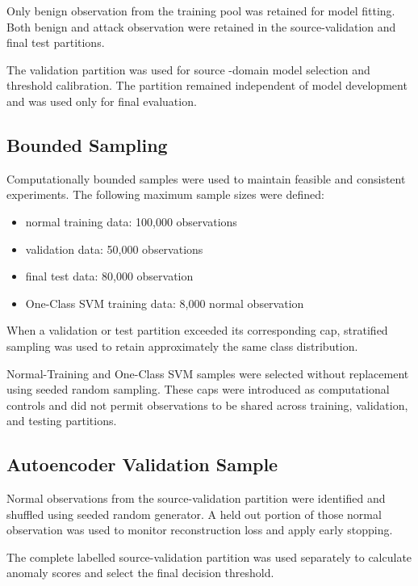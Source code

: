  Only benign observation from the training pool was retained for model fitting. Both benign and attack observation were retained in the source-validation and final test partitions.
 
 The validation partition was used for source -domain model selection and threshold calibration. The partition remained independent of model development and was used only for final evaluation.
 
 \subsection{Bounded Sampling}
 
 Computationally bounded samples were used to maintain feasible and consistent experiments. The following maximum sample sizes were defined:
 
 \begin{itemize}
        \item normal training data: 100,000 observations
        \item validation data: 50,000 observations
        \item final test data: 80,000 observation
        \item One-Class SVM training data: 8,000 normal observation
 \end{itemize}
 
 When a validation or test partition exceeded its corresponding cap, stratified sampling was used to retain approximately the same class distribution.
 
 Normal-Training and One-Class SVM samples were selected without replacement using seeded random sampling. These caps were introduced as  computational controls and did not permit observations to be shared across training, validation, and testing partitions.
 
 \subsection{Autoencoder Validation Sample}
 
 Normal observations from the source-validation partition were identified and shuffled using seeded random generator. A held out portion of those normal observation was used to monitor reconstruction loss and apply early stopping.
 
 The complete labelled source-validation partition was used separately to calculate anomaly scores and select the final decision threshold.
 
